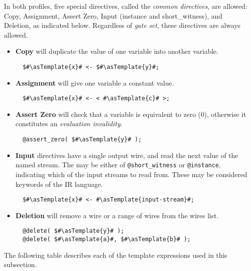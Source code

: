 In both profiles, five special directives, called the \emph{common directives}, are allowed: Copy, Assignment, Assert Zero, Input (instance and short\_witness), and Deletion, as indicated below.
Regardless of \textit{gate set}, these directives are always allowed.
\begin{itemize}
  \item \textbf{Copy} will duplicate the value of one variable into another variable.
  \begin{lstlisting}
  $#\asTemplate{x}# <- $#\asTemplate{y}#;
  \end{lstlisting}
  \item \textbf{Assignment} will give one variable a constant value.
  \begin{lstlisting}
  $#\asTemplate{x}# <- < #\asTemplate{c}# >;
  \end{lstlisting}
  \item \textbf{Assert Zero} will check that a variable is equivalent to zero (0), otherwise it constitutes an \textit{evaluation invalidity}.
  \begin{lstlisting}
  @assert_zero( $#\asTemplate{y}# );
  \end{lstlisting}
  \item \textbf{Input} directives have a single output wire, and read the next value of the named stream.
    The  may be either of \verb|@short_witness| or \verb|@instance|, indicating which of the input streams to read from.
    These may be considered keywords of the IR language.
  \begin{lstlisting}
  $#\asTemplate{x}# <- #\asTemplate{input-stream}#;
  \end{lstlisting}
  \item \textbf{Deletion} will remove a wire or a range of wires from the wires list.
  \begin{lstlisting}
  @delete( $#\asTemplate{y}# );
  @delete( $#\asTemplate{a}#, $#\asTemplate{b}# );
  \end{lstlisting}
\end{itemize}

The following table describes each of the template expressions used in this subsection.\\

